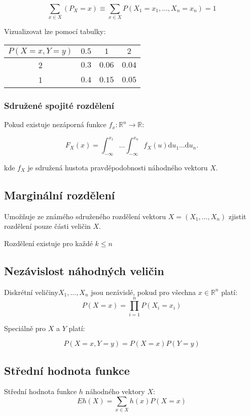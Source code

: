 $$
    \sum_{x\in X}{(P_X = x)} \equiv \sum_{x \in X}{P(X_1 = x_1, \dots, X_n = x_n)} = 1
$$

Vizualizovat lze pomocí tabulky:

\begin{center}
\begin{tabular}{c|c c c}
    $P(X = x, Y = y)$ & $0.5$ & $1$ & $2$ \\ \hline
    2 & $0.3$ & $0.06$ & $0.04$ \\
    1 & $0.4$ & $0.15$ & $0.05$
\end{tabular}
\end{center}

\subsubsection*{Sdružené spojité rozdělení}

Pokud existuje nezáporná funkce $f_x: \mathbb{R}^n \rightarrow \mathbb{R}$:

$$
    F_X(x) = \int_{-\infty}^{x_1}{\dots} \int_{-\infty}^{x_n}{f_X(u)\textrm{d}u_1\dots\textrm{d}u_n}.
$$

kde $f_X$ je sdružená hustota pravděpodobnosti náhodného vektoru $X$.

\subsection{Marginální rozdělení}

Umožňuje ze známého sdruženého rozdělení vektoru $X = (X_1, \dots, X_n)$ zjistit rozdělení pouze části veličin $X$.

Rozdělení existuje pro každé $k \leq n$

\subsection{Nezávislost náhodných veličin}

Diskrétní veličiny$ X_1, \dots, X_n$ jsou nezávislé, pokud pro všechna $x \in \mathbb{R}^n$ platí:
$$
    P(X=x) = \prod_{i=1}^{n}{P(X_i = x_i)}
$$

Speciálně pro $X$ a $Y$ platí:

$$
    P(X = x, Y = y) = P(X=x)P(Y=y)
$$

\subsection{Střední hodnota funkce}

Střední hodnota funkce $h$ náhodného vektory $X$:
$$
    Eh(X) = \sum_{x\in X}{h(x)P(X=x)}
$$

